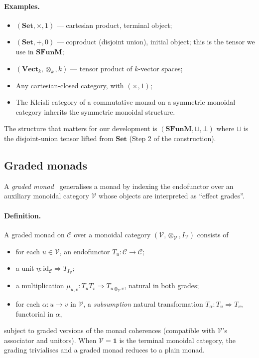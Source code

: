 \documentclass[11pt]{article}
\newcommand{\Set}{\mathbf{Set}}
\newcommand{\SFunM}{\mathbf{SFunM}}
\newcommand{\id}{\mathrm{id}}
\begin{document}
\paragraph{Examples.}
\begin{itemize}
  \item $(\Set, \times, 1)$ --- cartesian product, terminal object;
  \item $(\Set, +, 0)$ --- coproduct (disjoint union), initial object;
        this is the tensor we use in $\SFunM$;
  \item $(\mathbf{Vect}_k, \otimes_k, k)$ --- tensor product of
        $k$-vector spaces;
  \item Any cartesian-closed category, with $(\times, 1)$;
  \item The Kleisli category of a commutative monad on a symmetric
        monoidal category inherits the symmetric monoidal structure.
\end{itemize}

The structure that matters for our development is
$(\SFunM, \sqcup, \bot)$ where $\sqcup$ is the disjoint-union tensor
lifted from $\Set$ (Step 2 of the construction).

\subsection{Graded monads}
\label{sec:graded}

A \emph{graded monad}~\cite{Katsumata} generalises a monad by
indexing the endofunctor over an auxiliary monoidal category
$\mathcal{V}$ whose objects are interpreted as ``effect grades''.

\paragraph{Definition.}
A graded monad on $\mathcal{C}$ over a monoidal category
$(\mathcal{V}, \otimes_\mathcal{V}, I_\mathcal{V})$ consists of
\begin{itemize}
  \item for each $u \in \mathcal{V}$, an endofunctor
        $T_u : \mathcal{C} \to \mathcal{C}$;
  \item a unit $\eta : \id_\mathcal{C} \Rightarrow T_{I_\mathcal{V}}$;
  \item a multiplication
        $\mu_{u,v} : T_u T_v \Rightarrow T_{u \otimes_\mathcal{V} v}$,
        natural in both grades;
  \item for each $\alpha : u \to v$ in $\mathcal{V}$, a
        \emph{subsumption} natural transformation
        $T_\alpha : T_u \Rightarrow T_v$, functorial in $\alpha$,
\end{itemize}
subject to graded versions of the monad coherences (compatible with
$\mathcal{V}$'s associator and unitors).  When $\mathcal{V} =
\mathbf{1}$ is the terminal monoidal category, the grading
trivialises and a graded monad reduces to a plain monad.
\end{document}
